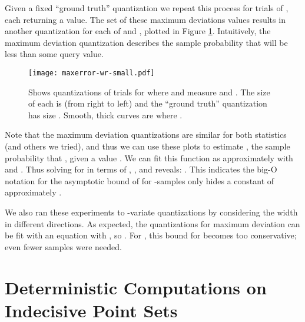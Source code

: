 \documentclass{journal}
\begin{document}
Given a fixed ``ground truth'' quantization  we repeat this process for  trials of , each returning a  value.  The set of these  maximum deviations values results in another quantization  for each of  and , plotted in Figure \ref{fig:maxerr-dwr}.
Intuitively, the maximum deviation quantization  describes the sample probability that  will be less than some query value.

\begin{figure}[tbh]
\begin{center}
\texttt{[image: maxerror-wr-small.pdf]}
\end{center}
\caption{\label{fig:maxerr-dwr}
Shows quantizations of  trials for  where  and  measure  and .  The size of each  is  (from right to left) and the ``ground truth'' quantization  has size .  Smooth, thick curves are  where .  }
\end{figure}

Note that the maximum deviation quantizations  are similar for both statistics (and others we tried), and thus we can use these plots to estimate , the sample probability that , given a value .  We can fit this function as approximately  with  and .  Thus solving for  in terms of , , and  reveals: .
This indicates the big-O notation for the asymptotic bound of  \cite{LLS01} for -samples only hides a constant of approximately .

We also ran these experiments to -variate quantizations by considering the width in  different directions.  As expected, the quantizations for maximum deviation can be fit with an equation  with , so .  For , this bound for  becomes too conservative; even fewer samples were needed.


































\section {Deterministic Computations on Indecisive Point Sets}
\label {sec:pointsetsets}
  
\end{document}
